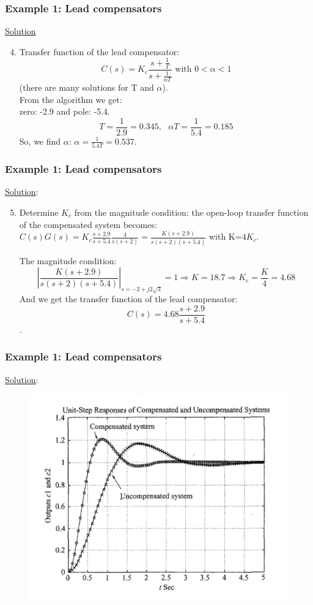 \begin{frame}
	\frametitle{Example 1: Lead compensators}
	\underline{Solution}
	\begin{enumerate}
		\setcounter{enumi}{3}
		\item Transfer function of the lead compensator: $$C(s)=K_c\frac{s+\frac{1}{T}}{s+\frac{1}{\alpha T}} \text{ with } 0<\alpha<1$$
		(there are many solutions for T and $\alpha$). \\
		From the algorithm we get:\\ zero: -2.9 and pole: -5.4.\\
		$$T=\frac{1}{2.9}=0.345,\text{   } \alpha T=\frac{1}{5.4}=0.185$$
		So, we find $\alpha$: $\alpha=\frac{1}{5.4T}=0.537$.
	\end{enumerate}
\end{frame}

\begin{frame}
	\frametitle{Example 1: Lead compensators}
	\underline{Solution}:
	\begin{enumerate}
		\setcounter{enumi}{4}
		\item Determine $K_c$ from the magnitude condition: the open-loop transfer function of the compensated system becomes:\\
		$C(s)G(s)=K_c\frac{s+2.9}{s+5.4}\frac{4}{s(s+2)}=\frac{K(s+2.9)}{s(s+2)(s+5.4)}$ with K=$4K_c$.\vspace{3mm}
		
		The magnitude condition:
		$$|\frac{K(s+2.9)}{s(s+2)(s+5.4)}|_{s=-2+j2\sqrt{3}}=1 \Rightarrow K=18.7 \Rightarrow K_c=\frac{K}{4}=4.68$$
		And we get the transfer function of the lead compensator:
		$$C(s)=4.68\frac{s+2.9}{s+5.4}$$.
	\end{enumerate}
\end{frame}

\begin{frame}
	\frametitle{Example 1: Lead compensators}
	\underline{Solution}:
	\begin{figure}
		\centering
		\includegraphics[width=0.7\linewidth]{Ex1_response}
	\end{figure}
\end{frame}


